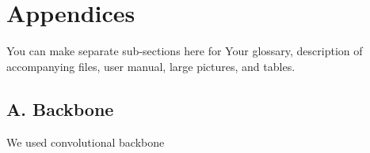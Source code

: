 \section*{Appendices} \label{appendices} 
You can make separate sub-sections here for Your glossary, description of accompanying files, user manual, large pictures, and tables.

 \subsection*{A. Backbone} \label{Appendix:Backbone}

We used convolutional backbone

